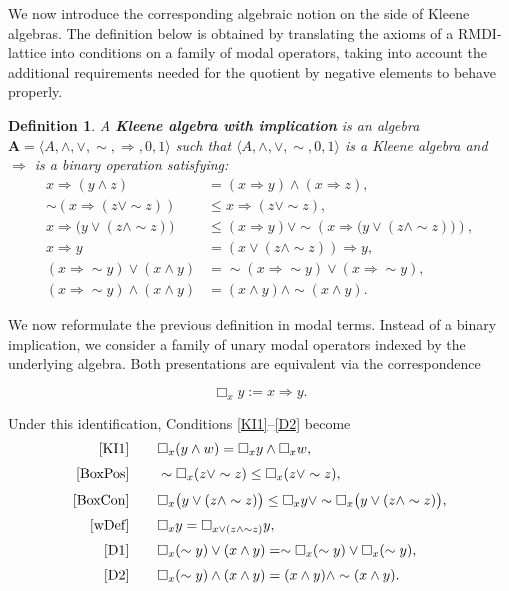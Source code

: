 \documentclass{article}
\newtheorem{definition}[theorem]{Definition}
\newcommand{\A}{\mathbf{A}}
\begin{document}
We now introduce the corresponding algebraic notion on the side of Kleene algebras. The definition below
is obtained by translating the axioms of a $\mathrm{RMDI}$-lattice into conditions on a family of modal
operators, taking into account the additional requirements needed for the quotient by negative elements to behave properly.

\begin{definition}
A \textbf{Kleene algebra with implication} is an algebra $\A=\langle A,\wedge,\vee,\sim,\Rightarrow,0,1\rangle$ such that $\langle A,\wedge,\vee,\sim,0,1\rangle$ is a Kleene algebra and $\Rightarrow$ is a binary operation satisfying: 
\begin{align}
x\Rightarrow(y\wedge z)
&=(x\Rightarrow y)\wedge(x\Rightarrow z),
\tag{KI1}\label{KI1}\\
\sim(x\Rightarrow(z\vee\sim z))
&\le x\Rightarrow(z\vee\sim z),
\tag{BoxPos}\label{BoxPos}\\
x\Rightarrow\bigl(y\vee(z\wedge\sim z)\bigr)
&\le (x\Rightarrow y)\vee
\sim\!\left(x\Rightarrow\bigl(y\vee(z\wedge\sim z)\bigr)\right),
\tag{BoxCon}\label{BoxCon}\\
x\Rightarrow y
&=(x\vee(z\wedge\sim z))\Rightarrow y,
\tag{wDef}\label{wDef}\\
(x\Rightarrow\sim y)\vee(x\wedge y)
&=\sim(x\Rightarrow\sim y)\vee(x\Rightarrow\sim y),
\tag{D1}\label{D1}\\
(x\Rightarrow\sim y)\wedge(x\wedge y)
&=(x\wedge y)\wedge\sim(x\wedge y).
\tag{D2}\label{D2}
\end{align}
    
\end{definition}

We now reformulate the previous definition in modal terms. Instead of a binary implication, we consider a family of unary modal operators indexed by the underlying algebra. Both presentations are equivalent via the correspondence

\[
\Box_x y:=x\Rightarrow y.
\]

Under this identification, Conditions \eqref{KI1}--\eqref{D2} become
\[
\begin{aligned}
\eqref{KI1}\qquad
&\Box_x(y \wedge w)
= \Box_x y \wedge \Box_x w,\\[1mm]
\eqref{BoxPos}\qquad
&\sim \Box_x (z \vee \sim z)
\leq \Box_x (z \vee \sim z),\\[1mm]
\eqref{BoxCon}\qquad
&\Box_x \bigl(y \vee (z \wedge \sim z)\bigr)
\leq \Box_x y \vee
\sim \Box_x \bigl(y \vee (z \wedge \sim z)\bigr),\\[1mm]
\eqref{wDef}\qquad
&\Box_x y
=\Box_{x\vee(z\wedge\sim z)}y,\\[1mm]
\eqref{D1}\qquad
&\Box_x(\sim y)\vee (x\wedge y)
=\sim \Box_x(\sim y)\vee \Box_x(\sim y),\\[1mm]
\eqref{D2}\qquad
&\Box_x(\sim y)\wedge (x\wedge y)
=(x\wedge y)\wedge \sim (x\wedge y).
\end{aligned}
\]
\end{document}
